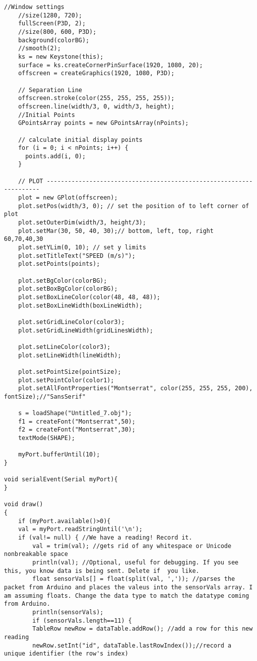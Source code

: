 \begin{lstlisting}[style=codejava]
	//Window settings
	//size(1280, 720);
	fullScreen(P3D, 2);
	//size(800, 600, P3D);
	background(colorBG);
	//smooth(2);
	ks = new Keystone(this);
	surface = ks.createCornerPinSurface(1920, 1080, 20);
	offscreen = createGraphics(1920, 1080, P3D);
	
	// Separation Line
	offscreen.stroke(color(255, 255, 255, 255));
	offscreen.line(width/3, 0, width/3, height);
	//Initial Points
	GPointsArray points = new GPointsArray(nPoints);
	
	// calculate initial display points
	for (i = 0; i < nPoints; i++) {
	  points.add(i, 0);
	}
	
	// PLOT --------------------------------------------------------------------
	plot = new GPlot(offscreen);
	plot.setPos(width/3, 0); // set the position of to left corner of plot
	plot.setOuterDim(width/3, height/3);
	plot.setMar(30, 50, 40, 30);// bottom, left, top, right 60,70,40,30
	plot.setYLim(0, 10); // set y limits
	plot.setTitleText("SPEED (m/s)");
	plot.setPoints(points);
	
	plot.setBgColor(colorBG);
	plot.setBoxBgColor(colorBG);
	plot.setBoxLineColor(color(48, 48, 48));
	plot.setBoxLineWidth(boxLineWidth);
	
	plot.setGridLineColor(color3);
	plot.setGridLineWidth(gridLinesWidth);
	
	plot.setLineColor(color3);
	plot.setLineWidth(lineWidth);
	
	plot.setPointSize(pointSize);
	plot.setPointColor(color1);
	plot.setAllFontProperties("Montserrat", color(255, 255, 255, 200), fontSize);//"SansSerif"
	
	s = loadShape("Untitled_7.obj");
	f1 = createFont("Montserrat",50);
	f2 = createFont("Montserrat",30);
	textMode(SHAPE);
	
	myPort.bufferUntil(10);
}

void serialEvent(Serial myPort){
}

void draw()
{
	if (myPort.available()>0){
	val = myPort.readStringUntil('\n'); 
	if (val!= null) { //We have a reading! Record it.
		val = trim(val); //gets rid of any whitespace or Unicode nonbreakable space
		println(val); //Optional, useful for debugging. If you see this, you know data is being sent. Delete if  you like. 
		float sensorVals[] = float(split(val, ',')); //parses the packet from Arduino and places the valeus into the sensorVals array. I am assuming floats. Change the data type to match the datatype coming from Arduino. 
		println(sensorVals);
		if (sensorVals.length==11) {
		TableRow newRow = dataTable.addRow(); //add a row for this new reading
		newRow.setInt("id", dataTable.lastRowIndex());//record a unique identifier (the row's index)


\end{lstlisting}
